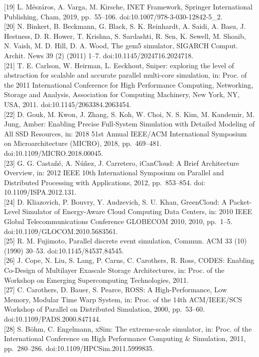 \documentclass[
]{article}
\begin{document}
{[}19{]} L. Mészáros, A. Varga, M. Kirsche, INET Framework, Springer
International Publishing, Cham, 2019, pp.~55--106.
doi:10.1007/978-3-030-12842-5\_2.\\
{[}20{]} N. Binkert, B. Beckmann, G. Black, S. K. Reinhardt, A. Saidi,
A. Basu, J. Hestness, D. R. Hower, T. Krishna, S. Sardashti, R. Sen, K.
Sewell, M. Shoaib, N. Vaish, M. D. Hill, D. A. Wood, The gem5 simulator,
SIGARCH Comput. Archit. News 39 (2) (2011) 1--7.
doi:10.1145/2024716.2024718.\\
{[}21{]} T. E. Carlson, W. Heirman, L. Eeckhout, Sniper: exploring the
level of abstraction for scalable and accurate parallel multi-core
simulation, in: Proc. of the 2011 International Conference for High
Performance Computing, Networking, Storage and Analysis, Association for
Computing Machinery, New York, NY, USA, 2011.
doi:10.1145/2063384.2063454.\\
{[}22{]} D. Gouk, M. Kwon, J. Zhang, S. Koh, W. Choi, N. S. Kim, M.
Kandemir, M. Jung, Amber: Enabling Precise Full-System Simulation with
Detailed Modeling of All SSD Resources, in: 2018 51st Annual IEEE/ACM
International Symposium on Microarchitecture (MICRO), 2018,
pp.~469--481. doi:10.1109/MICRO.2018.00045.\\
{[}23{]} G. G. Castañé, A. Núñez, J. Carretero, iCanCloud: A Brief
Architecture Overview, in: 2012 IEEE 10th International Symposium on
Parallel and Distributed Processing with Applications, 2012,
pp.~853--854. doi: 10.1109/ISPA.2012.131.\\
{[}24{]} D. Kliazovich, P. Bouvry, Y. Audzevich, S. U. Khan, GreenCloud:
A Packet-Level Simulator of Energy-Aware Cloud Computing Data Centers,
in: 2010 IEEE Global Telecommunications Conference GLOBECOM 2010, 2010,
pp.~1--5. doi:10.1109/GLOCOM.2010.5683561.\\
{[}25{]} R. M. Fujimoto, Parallel discrete event simulation, Commun. ACM
33 (10) (1990) 30--53. doi:10.1145/84537.84545.\\
{[}26{]} J. Cope, N. Liu, S. Lang, P. Carns, C. Carothers, R. Ross,
CODES: Enabling Co-Design of Multilayer Exascale Storage Architectures,
in: Proc. of the Workshop on Emerging Supercomputing Technologies,
2011.\\
{[}27{]} C. Carothers, D. Bauer, S. Pearce, ROSS: A High-Performance,
Low Memory, Modular Time Warp System, in: Proc. of the 14th ACM/IEEE/SCS
Workshop of Parallel on Distributed Simulation, 2000, pp.~53--60.
doi:10.1109/PADS.2000.847144.\\
{[}28{]} S. Böhm, C. Engelmann, xSim: The extreme-scale simulator, in:
Proc. of the International Conference on High Performance Computing \&
Simulation, 2011, pp.~280--286. doi:10.1109/HPCSim.2011.5999835.
\end{document}

